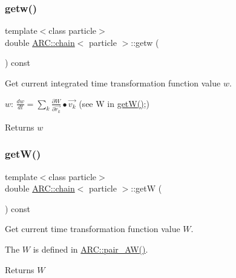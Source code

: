 \subsubsection{\texorpdfstring{getw()}{getw()}}
{\footnotesize\ttfamily template$<$class particle$>$ \\
double \hyperlink{classARC_1_1chain}{A\+R\+C\+::chain}$<$ particle $>$\+::getw (\begin{DoxyParamCaption}{ }\end{DoxyParamCaption}) const\hspace{0.3cm}{\ttfamily [inline]}}



Get current integrated time transformation function value $w$. 

$w$\+: $ \frac{dw}{dt} = \sum_k \frac{\partial W}{\partial \vec{r_k}} \bullet \vec{v_k} $ (see W in \hyperlink{classARC_1_1chain_a43f7ea8573dcbc4849232c97be26456f}{get\+W()};) \begin{DoxyReturn}{Returns}
$w$ 
\end{DoxyReturn}
\hypertarget{classARC_1_1chain_a43f7ea8573dcbc4849232c97be26456f}{}\label{classARC_1_1chain_a43f7ea8573dcbc4849232c97be26456f} 
\subsubsection{\texorpdfstring{get\+W()}{getW()}}
{\footnotesize\ttfamily template$<$class particle$>$ \\
double \hyperlink{classARC_1_1chain}{A\+R\+C\+::chain}$<$ particle $>$\+::getW (\begin{DoxyParamCaption}{ }\end{DoxyParamCaption}) const\hspace{0.3cm}{\ttfamily [inline]}}



Get current time transformation function value $W$. 

The $W$ is defined in \hyperlink{namespaceARC_a5c4308ca4a8d0e0ff59fdce30f00274c}{A\+R\+C\+::pair\+\_\+\+A\+W()}. \begin{DoxyReturn}{Returns}
$W$ 
\end{DoxyReturn}
\hypertarget{classARC_1_1chain_aa016cf633d19079dca24565b80a36a3f}{}\label{classARC_1_1chain_aa016cf633d19079dca24565b80a36a3f} 
